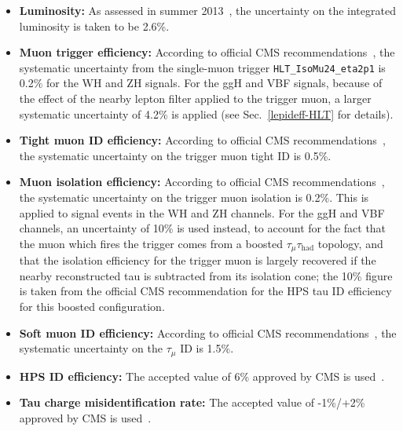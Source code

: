 \begin{itemize}
\item \textbf{Luminosity: } As assessed in summer 2013~\cite{CMS-PAS-LUM-13-001}, the uncertainty on the integrated luminosity is taken to be 2.6\%.
\item \textbf{Muon trigger efficiency: } According to official CMS recommendations~\cite{CMS:muonuncertaintytwiki}, the systematic uncertainty from the single-muon trigger \texttt{HLT\_IsoMu24\_eta2p1} is 0.2\% for the WH and ZH signals. For the ggH and VBF signals, because of the effect of the nearby lepton filter applied to the trigger muon, a larger systematic uncertainty of 4.2\% is applied (see Sec.~\ref{lepideff-HLT} for details).
\item \textbf{Tight muon ID efficiency: } According to official CMS recommendations~\cite{CMS:muonuncertaintytwiki}, the systematic uncertainty on the trigger muon tight ID is 0.5\%.
\item \textbf{Muon isolation efficiency: } According to official CMS recommendations~\cite{CMS:muonuncertaintytwiki}, the systematic uncertainty on the trigger muon isolation is 0.2\%. This is applied to signal events in the WH and ZH channels. For the ggH and VBF channels, an uncertainty of 10\% is used instead, to account for the fact that the muon which fires the trigger comes from a boosted $\tau_{\mu}\tau_{\text{had}}$ topology, and that the isolation efficiency for the trigger muon is largely recovered if the nearby reconstructed tau is subtracted from its isolation cone; the 10\% figure is taken from the official CMS recommendation for the HPS tau ID efficiency for this boosted configuration.
\item \textbf{Soft muon ID efficiency: } According to official CMS recommendations~\cite{CMS:muonuncertaintytwiki}, the systematic uncertainty on the $\tau_{\mu}$ ID is 1.5\%.
\item \textbf{HPS ID efficiency: } The accepted value of 6\% approved by CMS is used~\cite{CMS:tauuncertaintytwiki}.
\item \textbf{Tau charge misidentification rate: } The accepted value of -1\%/+2\% approved by CMS is used~\cite{CMS:tauuncertaintytwiki}.

\end{itemize}
